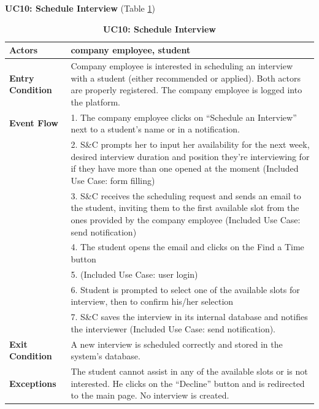 \textbf{UC10: Schedule Interview }(Table \ref{tab:UC10})
\begin{table}[H]
\centering
\caption{\textbf{UC10: Schedule Interview}}
\label{tab:UC10}
\begin{tabularx}{\textwidth}{|X|X|}
\hline
\textbf{Actors}           & company employee, student                                \\ \hline
\textbf{Entry Condition}   & Company employee is interested in scheduling an interview with a student (either recommended or applied). Both actors are properly registered. The company employee is logged into the platform. \\ \hline
\textbf{Event Flow}        & 1. The company employee clicks on “Schedule an Interview” next to a student’s name or in a notification. \\
                           & 2. S\&C prompts her to input her availability for the next week, desired interview duration and position they’re interviewing for if they have more than one opened at the moment (Included Use Case: form filling) \\
                           & 3. S\&C receives the scheduling request and sends an email to the student, inviting them to the first available slot from the ones provided by the company employee (Included Use Case: send notification) \\
                           & 4. The student opens the email and clicks on the Find a Time button \\
                           & 5. (Included Use Case: user login) \\
                           & 6. Student is prompted to select one of the available slots for interview, then to confirm his/her selection \\
                           & 7. S\&C saves the interview in its internal database and notifies the interviewer (Included Use Case: send notification). \\ \hline
\textbf{Exit Condition}    & A new interview is scheduled correctly and stored in the system’s database. \\ \hline
\textbf{Exceptions}        & The student cannot assist in any of the available slots or is not interested. He clicks on the “Decline” button and is redirected to the main page. No interview is created. \\ \hline
\end{tabularx}
\end{table}

